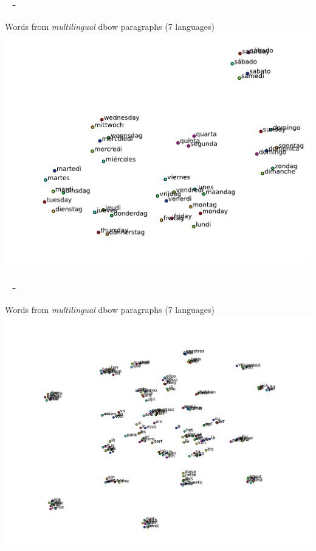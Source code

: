 \documentclass{beamer}
\newenvironment{dia}
{
\begin{frame}[fragile, environment=dia]
\frametitle{\insertsection
\ifx\insertsubsection\empty\else
      \,~-~\insertsubsection             %
   \fi}
}
{
\end{frame}
}
\begin{document}
\begin{dia}
Words from \emph{multilingual} dbow paragraphs (7 languages)
\includegraphics[width=1\linewidth]{figures/weekdays7}
\end{dia}

\begin{dia}
Words from \emph{multilingual} dbow paragraphs (7 languages)
\includegraphics[width=1\linewidth]{figures/en25freq7}
\end{dia}
\end{document}
